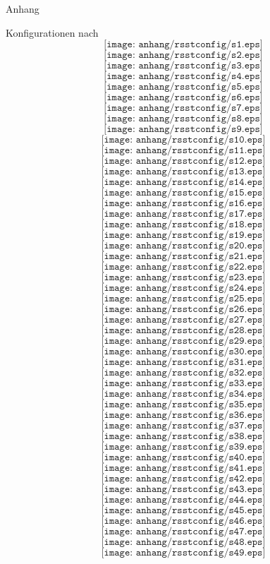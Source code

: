 \begin{chapter}{Anhang}
 \begin{section}{Konfigurationen nach \rsst}
  \[ \texttt{[image: anhang/rsstconfig/s1.eps]}\]
  \[ \texttt{[image: anhang/rsstconfig/s2.eps]}\]
  \[ \texttt{[image: anhang/rsstconfig/s3.eps]}\]
  \[ \texttt{[image: anhang/rsstconfig/s4.eps]}\]
  \[ \texttt{[image: anhang/rsstconfig/s5.eps]}\]
  \[ \texttt{[image: anhang/rsstconfig/s6.eps]}\]
  \[ \texttt{[image: anhang/rsstconfig/s7.eps]}\]
  \[ \texttt{[image: anhang/rsstconfig/s8.eps]}\]
  \[ \texttt{[image: anhang/rsstconfig/s9.eps]}\]
  \[ \texttt{[image: anhang/rsstconfig/s10.eps]}\]
  \[ \texttt{[image: anhang/rsstconfig/s11.eps]}\]
  \[ \texttt{[image: anhang/rsstconfig/s12.eps]}\]
  \[ \texttt{[image: anhang/rsstconfig/s13.eps]}\]
  \[ \texttt{[image: anhang/rsstconfig/s14.eps]}\]
  \[ \texttt{[image: anhang/rsstconfig/s15.eps]}\]
  \[ \texttt{[image: anhang/rsstconfig/s16.eps]}\]
  \[ \texttt{[image: anhang/rsstconfig/s17.eps]}\]
  \[ \texttt{[image: anhang/rsstconfig/s18.eps]}\]
  \[ \texttt{[image: anhang/rsstconfig/s19.eps]}\]
  \[ \texttt{[image: anhang/rsstconfig/s20.eps]}\]
  \[ \texttt{[image: anhang/rsstconfig/s21.eps]}\]
  \[ \texttt{[image: anhang/rsstconfig/s22.eps]}\]
  \[ \texttt{[image: anhang/rsstconfig/s23.eps]}\]
  \[ \texttt{[image: anhang/rsstconfig/s24.eps]}\]
  \[ \texttt{[image: anhang/rsstconfig/s25.eps]}\]
  \[ \texttt{[image: anhang/rsstconfig/s26.eps]}\]
  \[ \texttt{[image: anhang/rsstconfig/s27.eps]}\]
  \[ \texttt{[image: anhang/rsstconfig/s28.eps]}\]
  \[ \texttt{[image: anhang/rsstconfig/s29.eps]}\]
  \[ \texttt{[image: anhang/rsstconfig/s30.eps]}\]
  \[ \texttt{[image: anhang/rsstconfig/s31.eps]}\]
  \[ \texttt{[image: anhang/rsstconfig/s32.eps]}\]
  \[ \texttt{[image: anhang/rsstconfig/s33.eps]}\]
  \[ \texttt{[image: anhang/rsstconfig/s34.eps]}\]
  \[ \texttt{[image: anhang/rsstconfig/s35.eps]}\]
  \[ \texttt{[image: anhang/rsstconfig/s36.eps]}\]
  \[ \texttt{[image: anhang/rsstconfig/s37.eps]}\]
  \[ \texttt{[image: anhang/rsstconfig/s38.eps]}\]
  \[ \texttt{[image: anhang/rsstconfig/s39.eps]}\]
  \[ \texttt{[image: anhang/rsstconfig/s40.eps]}\] 
  \[ \texttt{[image: anhang/rsstconfig/s41.eps]}\]
  \[ \texttt{[image: anhang/rsstconfig/s42.eps]}\]
  \[ \texttt{[image: anhang/rsstconfig/s43.eps]}\]
  \[ \texttt{[image: anhang/rsstconfig/s44.eps]}\]
  \[ \texttt{[image: anhang/rsstconfig/s45.eps]}\]
  \[ \texttt{[image: anhang/rsstconfig/s46.eps]}\]
  \[ \texttt{[image: anhang/rsstconfig/s47.eps]}\]
  \[ \texttt{[image: anhang/rsstconfig/s48.eps]}\]
  \[ \texttt{[image: anhang/rsstconfig/s49.eps]}\]

\end{section}
\end{chapter}
